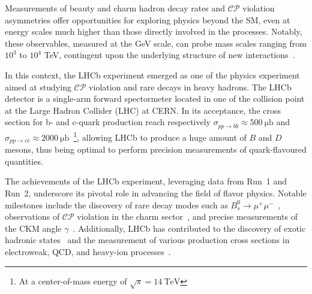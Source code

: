 
Measurements of beauty and charm hadron decay rates and $\mathcal{CP}$ violation asymmetries offer opportunities for exploring physics beyond the SM, even at energy scales much higher than those directly involved in the processes. Notably, these observables, measured at the GeV scale, can probe mass scales ranging from $10^3$ to $10^4$ TeV, contingent upon the underlying structure of new interactions~\cite{Isidori_2010}. 

In this context, the LHCb experiment emerged as one of the physics experiment aimed at studying $\mathcal{CP}$ violation and rare decays in heavy hadrons. The LHCb detector is a single-arm forward spectormeter located in one of the collision point at the Large Hadron Collider (LHC) at CERN. In its acceptance, the cross section for b- and c-quark production reach respectively $\sigma_{pp\rightarrow b\bar{b}}\approx\SI{500}{\micro\barn}$ and $\sigma_{pp\rightarrow c\bar{c}}\approx\SI{2000}{\micro\barn}$~\cite{bCrossSection, Aaij:2057627}\footnote{At a center-of-mass energy of $\sqrt{s}=\SI{14}{\tera\eV}$}, allowing LHCb to produce a huge amount of $B$ and $D$ mesons, thus being optimal to perform precision measurements of quark-flavoured quantities.


The achievements of the LHCb experiment, leveraging data from Run~1 and Run~2, underscore its pivotal role in advancing the field of flavor physics. Notable milestones include the discovery of rare decay modes such as $B^0_s\rightarrow\mu^+\mu^-$~\cite{PhysRevLett.111.101805}, observations of $\mathcal{CP}$ violation in the charm sector~\cite{Maccolini:2022y6}, and precise measurements of the CKM angle $\gamma$~\cite{Aaij_2016}. Additionally, LHCb has contributed to the discovery of exotic hadronic states~\cite{FANG202266, PhysRevLett.115.072001} and the measurement of various production cross sections in electroweak, QCD, and heavy-ion processes~\cite{ZBoson, Raab:2815873, Duan:2826531}.


